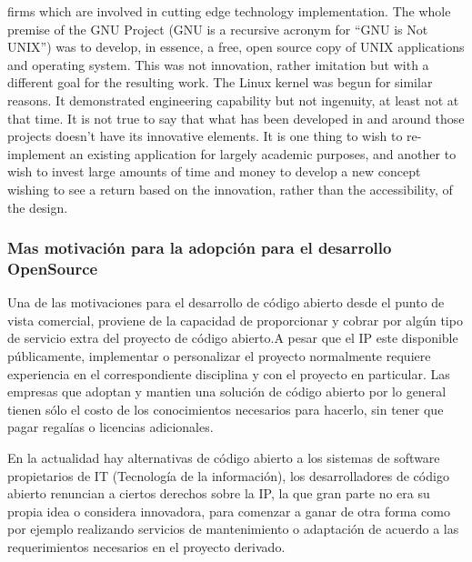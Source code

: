 firms which are involved in cutting edge technology implementation. The
whole premise of the GNU Project (GNU is a recursive acronym for “GNU is Not
UNIX”) was to develop, in essence, a free, open source copy of UNIX applications
and operating system. This was not innovation, rather imitation but with a different
goal for the resulting work. The Linux kernel was begun for similar reasons.
It demonstrated engineering capability but not ingenuity, at least not at that time.
It is not true to say that what has been developed in and around those projects
doesn’t have its innovative elements. It is one thing to wish to re-implement an
existing application for largely academic purposes, and another to wish to invest
large amounts of time and money to develop a new concept wishing to see a return
based on the innovation, rather than the accessibility, of the design.

		\subsubsection{Mas motivación para la adopción para el desarrollo OpenSource}

Una de las motivaciones para el desarrollo de código abierto desde el punto de vista comercial,  proviene de la capacidad de proporcionar y cobrar por algún tipo de servicio extra del proyecto de código abierto.A pesar que el IP este disponible públicamente, implementar o personalizar el proyecto normalmente requiere experiencia en el correspondiente disciplina y con el proyecto en particular. Las empresas que adoptan y mantien una solución de código abierto por lo general tienen sólo el costo de los conocimientos necesarios para hacerlo, sin tener que pagar regalías o licencias adicionales.  

En la actualidad hay alternativas de código abierto a los sistemas de software propietarios de IT (Tecnología de la información),  los desarrolladores de código abierto renuncian a ciertos derechos sobre la IP, la que gran parte no era su propia idea o considera innovadora, para comenzar a ganar de otra forma como por ejemplo realizando servicios de mantenimiento o adaptación de acuerdo a las requerimientos necesarios en el proyecto derivado.

